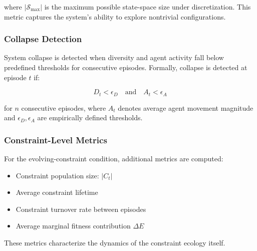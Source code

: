 where $|\mathcal{S}_{\max}|$ is the maximum possible state-space size under discretization. This metric captures the system’s ability to explore nontrivial configurations.

\subsubsection{Collapse Detection}

System collapse is detected when diversity and agent activity fall below predefined thresholds for consecutive episodes. Formally, collapse is detected at episode $t$ if:

\[
D_t < \epsilon_D \quad \text{and} \quad A_t < \epsilon_A
\]

for $n$ consecutive episodes, where $A_t$ denotes average agent movement magnitude and $\epsilon_D, \epsilon_A$ are empirically defined thresholds.

\subsubsection{Constraint-Level Metrics}

For the evolving-constraint condition, additional metrics are computed:

\begin{itemize}
    \item Constraint population size: $|C_t|$
    \item Average constraint lifetime
    \item Constraint turnover rate between episodes
    \item Average marginal fitness contribution $\Delta E$
\end{itemize}

These metrics characterize the dynamics of the constraint ecology itself.
